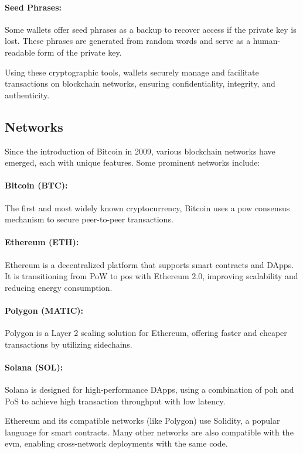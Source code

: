 \paragraph{Seed Phrases:}
Some wallets offer seed phrases as a backup to recover access if the private
key is lost. These phrases are generated from random words and serve as a
human-readable form of the private key.

Using these cryptographic tools, wallets securely manage and facilitate
transactions on blockchain networks, ensuring confidentiality, integrity, and
authenticity.

\subsection{Networks}
\label{subsec:networks}

Since the introduction of Bitcoin in 2009, various blockchain networks have
emerged, each with unique features. Some prominent networks include:

\paragraph{Bitcoin (BTC):}
The first and most widely known cryptocurrency, Bitcoin uses a \gls{pow}
consensus mechanism to secure peer-to-peer transactions.

\paragraph{Ethereum (ETH):}
Ethereum is a decentralized platform that supports smart contracts and DApps.
It is transitioning from PoW to \gls{pos} with Ethereum 2.0, improving
scalability and reducing energy consumption.

\paragraph{Polygon (MATIC):}
Polygon is a Layer 2 scaling solution for Ethereum, offering faster and cheaper
transactions by utilizing sidechains.

\paragraph{Solana (SOL):}
Solana is designed for high-performance DApps, using a combination of \gls{poh}
and PoS to achieve high transaction throughput with low latency.

Ethereum and its compatible networks (like Polygon) use Solidity, a popular
language for smart contracts. Many other networks are also compatible with the
\gls{evm}, enabling cross-network deployments with the same code.

